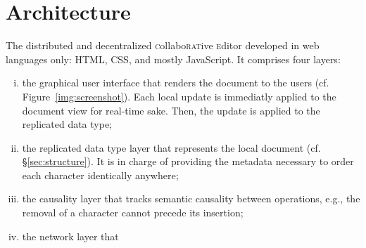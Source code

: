 
\section{Architecture}
\label{sec:architecture}

The distributed and decentralized \textsc{c}ollabo\textsc{rat}ive
\textsc{e}ditor \CRATE developed in web languages only: HTML, CSS, and mostly
JavaScript. It comprises four layers:
\begin{enumerate}[(i)]
\item the graphical user interface that renders the document to the users
  (cf. Figure~\ref{img:screenshot}). Each local update is immediatly applied to
  the document view for real-time sake. Then, the update is applied to the
  replicated data type;
\item the replicated data type layer that represents the local document
  (cf. §\ref{sec:structure}). It is in charge of providing the metadata
  necessary to order each character identically anywhere;
\item the causality layer that tracks semantic causality between operations,
  e.g., the removal of a character cannot precede its insertion;
\item the network layer that
\end{enumerate}

